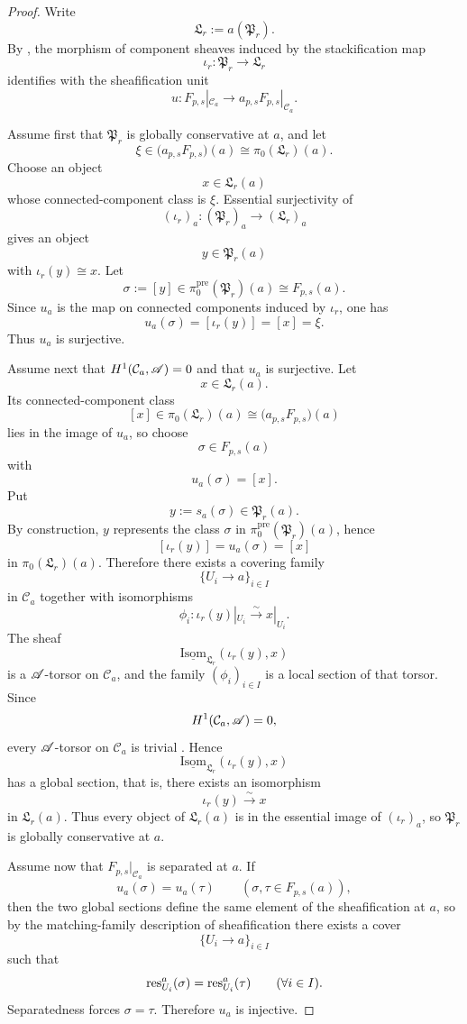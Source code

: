 \begin{proof}
Write
\[
\mathfrak L_r:=a(\mathfrak P_r).
\]
By , the morphism of component sheaves induced by the stackification map
\[
\iota_r:\mathfrak P_r\to \mathfrak L_r
\]
identifies with the sheafification unit
\[
u:F_{p,s}|_{\mathcal C_a}\to a_{p,s}F_{p,s}|_{\mathcal C_a}.
\]

Assume first that $\mathfrak P_r$ is globally conservative at $a$, and let
\[
\xi\in \bigl(a_{p,s}F_{p,s}\bigr)(a)\cong \pi_0(\mathfrak L_r)(a).
\]
Choose an object
\[
x\in \mathfrak L_r(a)
\]
whose connected-component class is $\xi$. Essential surjectivity of
\[
(\iota_r)_a:(\mathfrak P_r)_a\to (\mathfrak L_r)_a
\]
gives an object
\[
y\in \mathfrak P_r(a)
\]
with $\iota_r(y)\cong x$. Let
\[
\sigma:=[y]\in \pi_0^{\mathrm{pre}}(\mathfrak P_r)(a)\cong F_{p,s}(a).
\]
Since $u_a$ is the map on connected components induced by $\iota_r$, one has
\[
u_a(\sigma)=[\iota_r(y)]=[x]=\xi.
\]
Thus $u_a$ is surjective.

Assume next that $H^1(\mathcal C_a,\mathscr{A})=0$ and that $u_a$ is surjective. Let
\[
x\in \mathfrak L_r(a).
\]
Its connected-component class
\[
[x]\in \pi_0(\mathfrak L_r)(a)\cong \bigl(a_{p,s}F_{p,s}\bigr)(a)
\]
lies in the image of $u_a$, so choose
\[
\sigma\in F_{p,s}(a)
\]
with
\[
u_a(\sigma)=[x].
\]
Put
\[
y:=s_a(\sigma)\in \mathfrak P_r(a).
\]
By construction, $y$ represents the class $\sigma$ in $\pi_0^{\mathrm{pre}}(\mathfrak P_r)(a)$, hence
\[
[\iota_r(y)]=u_a(\sigma)=[x]
\]
in $\pi_0(\mathfrak L_r)(a)$. Therefore there exists a covering family
\[
\{U_i\to a\}_{i\in I}
\]
in $\mathcal C_a$ together with isomorphisms
\[
\phi_i:\iota_r(y)|_{U_i}\xrightarrow{\sim} x|_{U_i}.
\]
The sheaf
\[
\underline{\mathrm{Isom}}_{\mathfrak L_r}(\iota_r(y),x)
\]
is a $\mathscr{A}$-torsor on $\mathcal C_a$, and the family $(\phi_i)_{i\in I}$ is a local section of that torsor. Since
\[
H^1(\mathcal C_a,\mathscr{A})=0,
\]
every $\mathscr{A}$-torsor on $\mathcal C_a$ is trivial \cite[Chap.~III]{MacLaneMoerdijk1994}. Hence
\[
\underline{\mathrm{Isom}}_{\mathfrak L_r}(\iota_r(y),x)
\]
has a global section, that is, there exists an isomorphism
\[
\iota_r(y)\xrightarrow{\sim} x
\]
in $\mathfrak L_r(a)$. Thus every object of $\mathfrak L_r(a)$ is in the essential image of $(\iota_r)_a$, so $\mathfrak P_r$ is globally conservative at $a$.

Assume now that $F_{p,s}|_{\mathcal C_a}$ is separated at $a$. If
\[
u_a(\sigma)=u_a(\tau)
\qquad
(\sigma,\tau\in F_{p,s}(a)),
\]
then the two global sections define the same element of the sheafification at $a$, so by the matching-family description of sheafification there exists a cover
\[
\{U_i\to a\}_{i\in I}
\]
such that
\[
\mathrm{res}_{U_i}^a(\sigma)=\mathrm{res}_{U_i}^a(\tau)
\qquad
(\forall i\in I).
\]
Separatedness forces $\sigma=\tau$. Therefore $u_a$ is injective.


\end{proof}
